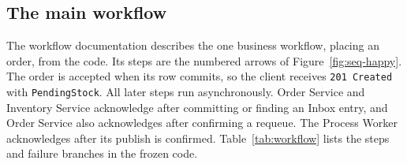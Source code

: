 \documentclass[a4paper]{report}
\begin{document}
\subsection{The main workflow}
\label{sec:workflow}

The workflow documentation describes the one business workflow, placing an
order, from the code. Its steps are the numbered arrows of
Figure~\ref{fig:seq-happy}. The order is accepted when its row commits, so
the client receives \texttt{201 Created} with \texttt{PendingStock}. All
later steps run asynchronously. Order Service and Inventory Service
acknowledge after committing or finding an Inbox entry, and Order Service
also acknowledges after confirming a requeue. The Process Worker acknowledges
after its publish is confirmed. Table~\ref{tab:workflow} lists the steps and
failure branches in the frozen code.
\end{document}
